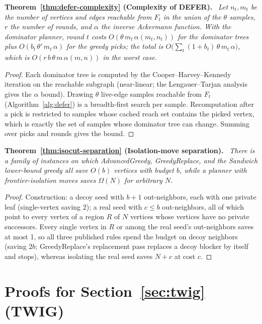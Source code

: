 \documentclass[ASNA,number]{USG}
\newenvironment{repeattheorem}[1][]{\par\medskip\noindent\textbf{#1.}\ \itshape}{\par\medskip}
\begin{document}
\begin{repeattheorem}[Theorem~\ref{thm:defer-complexity} (Complexity of DEFER)]
Let $n_t,m_t$ be the number of vertices and edges reachable from $F_t$ in
the union of the $\theta$ samples, $r$ the number of rounds, and $\alpha$
the inverse Ackermann function. With the dominator planner, round $t$
costs $O(\theta\,m_t\,\alpha(m_t,n_t))$ for the dominator trees plus
$O(b_t\,\theta'\,m_t\,\alpha)$ for the greedy picks; the total is
$O\bigl(\sum_t(1+b_t)\,\theta\,m_t\,\alpha\bigr)$, which is
$O(r\,b\,\theta\,m\,\alpha(m,n))$ in the worst case.
\end{repeattheorem}
\begin{proof}
Each dominator tree is computed by the Cooper--Harvey--Kennedy iteration
on the reachable subgraph (near-linear; the Lengauer--Tarjan analysis gives
the $\alpha$ bound). Drawing $\theta$ live-edge samples reachable from
$F_t$ (Algorithm~\ref{alg:defer}) is a breadth-first search per sample. Recomputation after a pick is restricted to samples
whose cached reach set contains the picked vertex, which is exactly the
set of samples whose dominator tree can change. Summing over picks and
rounds gives the bound.
\end{proof}

\begin{repeattheorem}[Theorem~\ref{thm:isocut-separation} (Isolation-move separation)]
There is a family of instances on which AdvancedGreedy, GreedyReplace, and
the Sandwich lower-bound greedy all save $O(b)$ vertices with budget $b$,
while a planner with frontier-isolation moves saves $\Omega(N)$ for
arbitrary $N$.
\end{repeattheorem}
\begin{proof}
Construction: a decoy seed with $b+1$ out-neighbors, each with one private
leaf (single-vertex saving 2); a real seed with $c\le b$ out-neighbors, all
of which point to every vertex of a region $R$ of $N$ vertices whose
vertices have no private successors. Every single vertex in $R$ or among
the real seed's out-neighbors saves at most 1, so all three published
rules spend the budget on decoy neighbors (saving $2b$; GreedyReplace's
replacement pass replaces a decoy blocker by itself and stops), whereas
isolating the real seed saves $N+c$ at cost $c$.
\end{proof}

\section{Proofs for Section~\ref{sec:twig} (TWIG)}\label{ec:twig-proofs}
\end{document}
